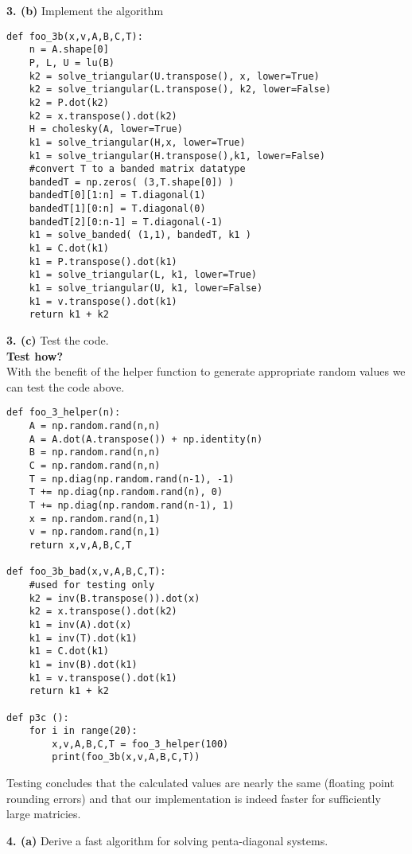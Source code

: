 \documentclass[12pt]{article}
\newcommand{\problem}[1]{\hspace{-4 ex} \large \textbf{#1}}
\begin{document}
\problem{3. (b)} Implement the algorithm \\
	\begin{lstlisting}
def foo_3b(x,v,A,B,C,T):
	n = A.shape[0]
	P, L, U = lu(B)
	k2 = solve_triangular(U.transpose(), x, lower=True)
	k2 = solve_triangular(L.transpose(), k2, lower=False)
	k2 = P.dot(k2)
	k2 = x.transpose().dot(k2)
	H = cholesky(A, lower=True)
	k1 = solve_triangular(H,x, lower=True)
	k1 = solve_triangular(H.transpose(),k1, lower=False)
	#convert T to a banded matrix datatype
	bandedT = np.zeros( (3,T.shape[0]) )
	bandedT[0][1:n] = T.diagonal(1)
	bandedT[1][0:n] = T.diagonal(0)
	bandedT[2][0:n-1] = T.diagonal(-1)
	k1 = solve_banded( (1,1), bandedT, k1 )
	k1 = C.dot(k1)
	k1 = P.transpose().dot(k1)
	k1 = solve_triangular(L, k1, lower=True)
	k1 = solve_triangular(U, k1, lower=False)
	k1 = v.transpose().dot(k1)
	return k1 + k2
	\end{lstlisting}
	
\problem{3. (c)} Test the code. \\
	\textbf{Test how?}\\
	With the benefit of the helper function to generate appropriate random values we can test the code above.
	\begin{lstlisting}
def foo_3_helper(n):
	A = np.random.rand(n,n)
	A = A.dot(A.transpose()) + np.identity(n)
	B = np.random.rand(n,n)
	C = np.random.rand(n,n)
	T = np.diag(np.random.rand(n-1), -1) 
	T += np.diag(np.random.rand(n), 0) 
	T += np.diag(np.random.rand(n-1), 1)
	x = np.random.rand(n,1)
	v = np.random.rand(n,1)
	return x,v,A,B,C,T
		
def foo_3b_bad(x,v,A,B,C,T):
	#used for testing only
	k2 = inv(B.transpose()).dot(x)
	k2 = x.transpose().dot(k2)
	k1 = inv(A).dot(x)
	k1 = inv(T).dot(k1)
	k1 = C.dot(k1)
	k1 = inv(B).dot(k1)
	k1 = v.transpose().dot(k1)
	return k1 + k2
	
def p3c ():
	for i in range(20):
		x,v,A,B,C,T = foo_3_helper(100)
		print(foo_3b(x,v,A,B,C,T))
	\end{lstlisting}
	Testing concludes that the calculated values are nearly the same (floating point rounding errors) and that our implementation is indeed faster for sufficiently large matricies.
	
\problem{4. (a)} Derive a fast algorithm for solving penta-diagonal systems. \\
\end{document}
